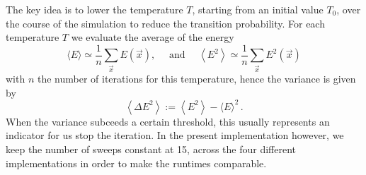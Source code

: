 The key idea is to lower the temperature $T$, starting from an initial value $T_0$, over the course of the simulation to reduce the transition probability.
For each temperature $T$ we evaluate the average of the energy
$$\langle E\rangle \simeq \frac{1}{n} \sum_{\vec{x}} E(\vec{x}), \quad \text { and } \quad\left\langle E^2\right\rangle \simeq \frac{1}{n} \sum_{\vec{x}} E^2(\vec{x})$$
with $n$ the number of iterations for this temperature, hence the variance is given by
$$\left\langle\Delta E^2\right\rangle:=\left\langle E^2\right\rangle-\langle E\rangle^2 \,.$$
When the variance subceeds a certain threshold, this usually represents an indicator for us stop the iteration.
In the present implementation however, we keep the number of sweeps constant at 15, across the four different implementations in order to make the runtimes comparable.
